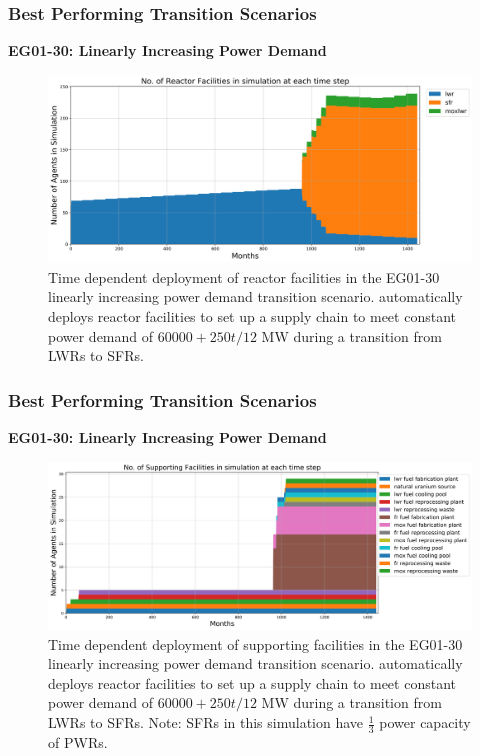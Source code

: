 \begin{frame}
    \frametitle{Best Performing Transition Scenarios}
    \textbf{EG01-30: Linearly Increasing Power Demand}
    \begin{figure}[htbp!]
        \begin{center}
          \includegraphics[width=\textwidth]{../paper/figures/eg30-stack_reactor.png}
        \end{center}
              \caption{Time dependent deployment of reactor facilities in 
              the EG01-30 linearly increasing power demand transition scenario. 
              \deploy automatically deploys reactor facilities 
              to set up a supply chain to meet constant power demand of $60000+250t/12$ MW
              during a transition from \glspl{LWR} to \glspl{SFR}.}
      \end{figure}
\end{frame}

\begin{frame}
    \frametitle{Best Performing Transition Scenarios}
    \textbf{EG01-30: Linearly Increasing Power Demand}
    \begin{figure}[htbp!]
        \begin{center}
          \includegraphics[width=\textwidth]{../paper/figures/eg30-stack_support.png}
        \end{center}
              \caption{Time dependent deployment of supporting facilities in 
              the EG01-30 linearly increasing power demand transition scenario. 
              \deploy automatically deploys reactor facilities 
              to set up a supply chain to meet constant power demand of $60000+250t/12$ MW
              during a transition from \glspl{LWR} to \glspl{SFR}. Note: \glspl{SFR}
              in this simulation have $\frac{1}{3}$ power capacity of \glspl{PWR}.}
      \end{figure}
\end{frame}

